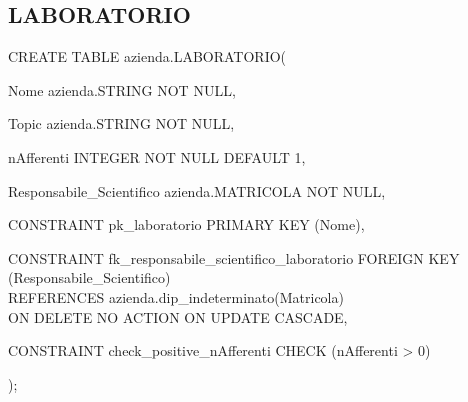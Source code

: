         \subsection{LABORATORIO}
            \ttfamily
                \begin{flushleft}
                    \begin{description}
                        \item CREATE TABLE azienda.LABORATORIO(                
                        \begin{description}
                            \item Nome azienda.STRING NOT NULL,
                            \item Topic azienda.STRING NOT NULL,
                            \item nAfferenti INTEGER NOT NULL DEFAULT 1,
                            \item Responsabile\_Scientifico azienda.MATRICOLA NOT NULL,
                            
                            \vspace{0.5cm}

                            \item CONSTRAINT pk\_laboratorio PRIMARY KEY (Nome),
                            \item CONSTRAINT fk\_responsabile\_scientifico\_laboratorio FOREIGN KEY (Responsabile\_Scientifico)\\
                            REFERENCES azienda.dip\_indeterminato(Matricola)\\
                            ON DELETE NO ACTION		ON UPDATE CASCADE,
                            \item CONSTRAINT check\_positive\_nAfferenti CHECK (nAfferenti > 0)
                        \end{description}
                        );
                    \end{description}
                \end{flushleft}
            \normalfont

